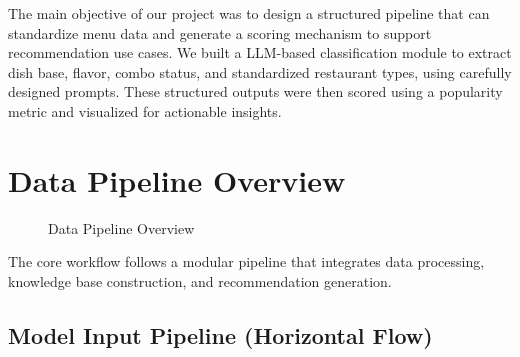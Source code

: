 \documentclass[
  11pt,
  a4paper,
  DIV=11,
  numbers=noendperiod]{scrartcl}
\begin{document}
The main objective of our project was to design a structured pipeline
that can standardize menu data and generate a scoring mechanism to
support recommendation use cases. We built a LLM-based classification
module to extract dish base, flavor, combo status, and standardized
restaurant types, using carefully designed prompts. These structured
outputs were then scored using a popularity metric and visualized for
actionable insights.

\section{Data Pipeline Overview}\label{data-pipeline-overview}

\begin{figure}

\caption{\label{fig-data-pipeline-overview}Data Pipeline Overview}


\end{figure}%

The core workflow follows a modular pipeline that integrates data
processing, knowledge base construction, and recommendation generation.

\newpage

\subsection{Model Input Pipeline (Horizontal
Flow)}\label{model-input-pipeline-horizontal-flow}
\end{document}
